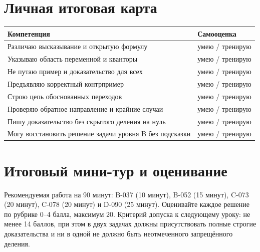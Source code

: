 \documentclass[11pt,a4paper,openany]{book}
\begin{document}
\section{Личная итоговая карта}
\begin{longtable}{p{}p{}}\toprule Компетенция & Самооценка\\\midrule\endhead
Различаю высказывание и открытую формулу & умею / тренирую\\
Указываю область переменной и кванторы & умею / тренирую\\
Не путаю пример и доказательство для всех & умею / тренирую\\
Предъявляю корректный контрпример & умею / тренирую\\
Строю цепь обоснованных переходов & умею / тренирую\\
Проверяю обратное направление и крайние случаи & умею / тренирую\\
Пишу доказательство без скрытого деления на нуль & умею / тренирую\\
Могу восстановить решение задачи уровня B без подсказки & умею / тренирую\\\bottomrule\end{longtable}
\section{Итоговый мини-тур и оценивание}
Рекомендуемая работа на 90 минут: B-037 (10 минут), B-052 (15 минут), C-073 (20 минут), C-078 (20 минут) и D-090 (25 минут). Оценивайте каждое решение по рубрике 0–4 балла, максимум 20. Критерий допуска к следующему уроку: не менее 14 баллов, при этом в двух задачах должны присутствовать полные строгие доказательства и ни в одной не должно быть неотмеченного запрещённого деления.
\end{document}
